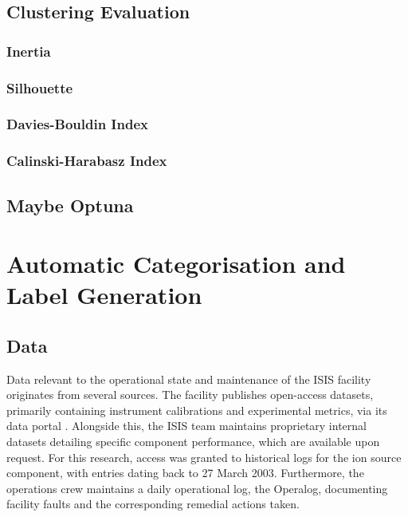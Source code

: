\documentclass[10pt,oneside]{report}
\begin{document}
\section{Clustering Evaluation}\label{sec:clusteringEval}

\subsection{Inertia}
\subsection{Silhouette}
\subsection{Davies-Bouldin Index}
\subsection{Calinski-Harabasz Index}

\section{Maybe Optuna}

\chapter{Automatic Categorisation and Label Generation}\label{chap:Methodology}

\section{Data}

Data relevant to the operational state and maintenance of the ISIS facility originates from several sources. The facility publishes open-access datasets, primarily containing instrument calibrations and experimental metrics, via its data portal \citep{isisdata}. Alongside this, the ISIS team maintains proprietary internal datasets detailing specific component performance, which are available upon request. For this research, access was granted to historical logs for the ion source component, with entries dating back to 27 March 2003. Furthermore, the operations crew maintains a daily operational log, the Operalog, documenting facility faults and the corresponding remedial actions taken.
\end{document}
